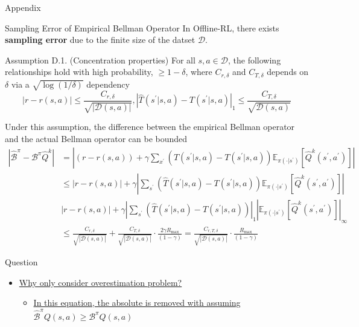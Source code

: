 \documentclass[11pt]{beamer}
\newcommand{\mbb}[1]{\mathbb{#1}}
\newcommand{\mc}[1]{\mathcal{#1}}
\newcommand{\tb}[1]{\textbf{#1}}
\newcommand{\abs}[1]{\left\lvert #1 \right\rvert}
\begin{document}
\begin{frame}{Appendix}
  \begin{block}{Sampling Error of Empirical Bellman Operator} \label{appendix:sampling_error}
    In Offline-RL, there exists \tb{sampling error} due to the finite size of the datset $\mc{D}$.

    \begin{block}{Assumption D.1. (Concentration properties)}
      For all $s,a \in \mc{D}$, the following relationships hold with high probability, $\geq 1-\delta$, where $C_{r,\delta}$ and $C_{T,\delta}$ depends on $\delta$ via a $\sqrt{\log(1/\delta)}$ dependency
      \[
        \abs{r - r(s,a)} \leq \frac{C_{r,\delta}}{\sqrt{\abs{\mc{D}(s,a)}}}, \abs{\hat{T}(s^\prime|s,a) - T(s^\prime |s,a)}_1 \leq \frac{C_{T,\delta}}{\sqrt{\mc{D}(s,a)}}
      \]
    \end{block}
    Under this assumption, the difference between the empirical Bellman operator and the actual Bellman operator can be bounded
    \[
      \begin{aligned}
        \abs{\hat{\mc{B}}^\pi - \mc{B}^\pi \hat{Q}^k} &= \abs{ (r - r(s,a)) + \gamma \sum_{x^\prime} \left(\hat{T}(s^\prime|s,a) - T(s^\prime |s,a)\right)\mbb{E}_{\pi(\cdot | s^\prime)}\left[ \hat{Q}^k (s^\prime, a^\prime)\right]} \\
        & \leq \abs{r - r(s,a)} + \gamma \abs{\sum_{s^\prime} \left(\hat{T}(s^\prime |s,a) - T(s^\prime |s,a)\right)\mbb{E}_{\pi(\cdot | s^\prime)}\left[\hat{Q}^k (s^\prime, a^\prime)\right]} \\
        &\abs{r - r(s,a)} + \gamma \abs{\sum_{s^\prime} \left(\hat{T}(s^\prime|s,a) - T(s^\prime|s,a)\right)}_1 \abs{\mbb{E}_{\pi(\cdot | s^\prime)}\left[\hat{Q}^k(s^\prime, a^\prime)\right]}_\infty \\
        &\leq \frac{C_{r,\delta}}{\sqrt{\abs{\mc{D}(s,a)}}} + \frac{C_{T,\delta}}{\sqrt{\abs{\mc{D}(s,a)}}} \cdot \frac{2\gamma R_{\text{max}}}{(1-\gamma)} = \frac{C_{r,T,\delta}}{\sqrt{\abs{\mc{D}(s,a)}}} \cdot \frac{R_{\text{max}}}{(1-\gamma)}
      \end{aligned}
    \]
  \end{block}
\end{frame}

\begin{frame}{Question}
  \begin{itemize}
    \item \hyperlink{text:why_only_consider_overestimation}{Why only consider overestimation problem?}
    \begin{itemize}
      \item \hyperlink{text:why_assume_overestimation}{In this equation, the absolute is removed with assuming $\hat{\mc{B}}^\pi Q(s,a) \geq \mc{B}^\pi Q(s,a)$}
    \end{itemize}
  \end{itemize}
\end{frame}
\end{document}
